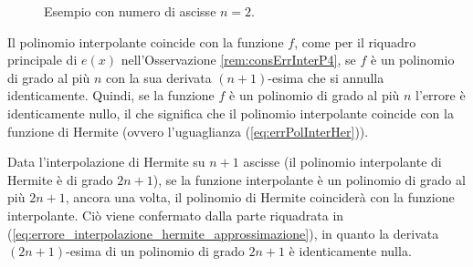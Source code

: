 \begin{figure}[ht]
	\centering
	\caption{\label{fig:osservazione_errore_interpolazione} Esempio con numero di ascisse $n=2$.}
\end{figure}

Il polinomio interpolante coincide con la funzione $f$, come per il riquadro principale di $e(x)$ nell'Osservazione \ref{rem:consErrInterP4}, se $f$ è un polinomio di grado al più $n$ con la sua derivata $(n+1)$-esima che si annulla identicamente. Quindi, se la funzione $f$ è un polinomio di grado al più $n$ l'errore è identicamente nullo, il che significa che il polinomio interpolante coincide con la funzione di Hermite (ovvero l'uguaglianza (\ref{eq:errPolInterHer})).

Data l'interpolazione di Hermite su $n+1$ ascisse (il polinomio interpolante di Hermite è di grado $2n+1$), se la funzione interpolante è un polinomio di grado al più $2n+1$, ancora una volta, il polinomio di Hermite coinciderà con la funzione interpolante. Ciò viene confermato dalla parte riquadrata in (\ref{eq:errore_interpolazione_hermite_approssimazione}), in quanto la derivata $(2n+1)$-esima di un polinomio di grado $2n+1$ è identicamente nulla.

